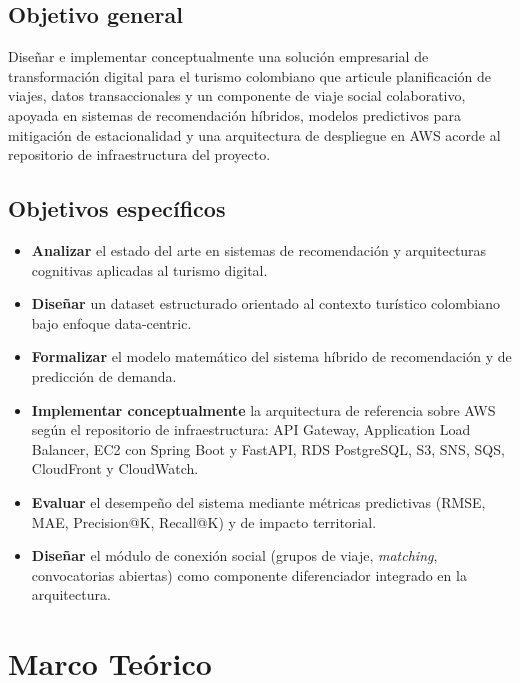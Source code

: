 \documentclass[12pt, letterpaper]{article}
\begin{document}
\subsection{Objetivo general}

Diseñar e implementar conceptualmente una solución empresarial de transformación digital para el turismo colombiano que articule planificación de viajes, datos transaccionales y un componente de viaje social colaborativo, apoyada en sistemas de recomendación híbridos, modelos predictivos para mitigación de estacionalidad y una arquitectura de despliegue en AWS acorde al repositorio de infraestructura del proyecto.

\subsection{Objetivos específicos}

\begin{itemize}
\item \textbf{Analizar} el estado del arte en sistemas de recomendación y arquitecturas cognitivas aplicadas al turismo digital.
\item \textbf{Diseñar} un dataset estructurado orientado al contexto turístico colombiano bajo enfoque data-centric.
\item \textbf{Formalizar} el modelo matemático del sistema híbrido de recomendación y de predicción de demanda.
\item \textbf{Implementar conceptualmente} la arquitectura de referencia sobre AWS según el repositorio de infraestructura: API Gateway, Application Load Balancer, EC2 con Spring Boot y FastAPI, RDS PostgreSQL, S3, SNS, SQS, CloudFront y CloudWatch.
\item \textbf{Evaluar} el desempeño del sistema mediante métricas predictivas (RMSE, MAE, Precision@K, Recall@K) y de impacto territorial.
\item \textbf{Diseñar} el módulo de conexión social (grupos de viaje, \textit{matching}, convocatorias abiertas) como componente diferenciador integrado en la arquitectura.
\end{itemize}

\section{Marco Teórico}
\end{document}

